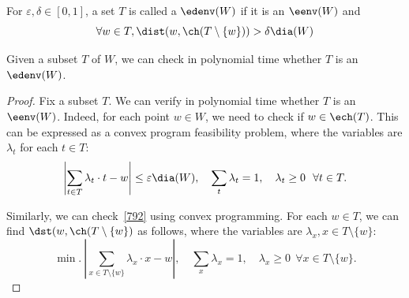 \begin{defn}\label{strict-envelope}
For $\varepsilon,\delta \in [0,1]$, a set $T$ is called a $\edenv(W)$ if it is an $\eenv(W)$ and  
\begin{equation}\label{792}
\forall w\in T, \dist(w,\ch(T\setminus \{w\}))> \delta \dia(W)
\end{equation}
\end{defn}

\begin{fact}
\label{f:check}
Given a subset $T$ of $W$, we can check in polynomial time whether $T$ is an $\edenv(W)$. 
\end{fact}

\begin{proof}
Fix a subset $T$. We can verify in polynomial time whether $T$ is an $\eenv(W)$. Indeed, for each point $w \in W$, we need to check if $w \in \ech(T)$. This can be expressed as a convex program feasibility problem, where the variables are $\lambda_t$ for each $t \in T$: 
$$ \left|\sum_{t \in T} \lambda_t \cdot t - w \right| \leq \varepsilon \dia(W), \quad \sum_t \lambda_t = 1, \quad \lambda_t \geq 0 \  \  \forall t \in T.$$ 

Similarly, we can check~\eqref{792} using convex programming. For each $w \in T$, we can find $\dst(w, \ch(T \setminus  \{w\})$ as follows, where the variables are $\lambda_x, x \in T \setminus \{w\}$: 
$$ \min. \ \left| \sum_{x \in T \setminus \{w\}} \lambda_x \cdot x - w \right|, \quad \sum_x \lambda_x = 1, \quad \lambda_x \geq 0 \  \  \forall x \in T\setminus \{w\}. $$
\end{proof}


